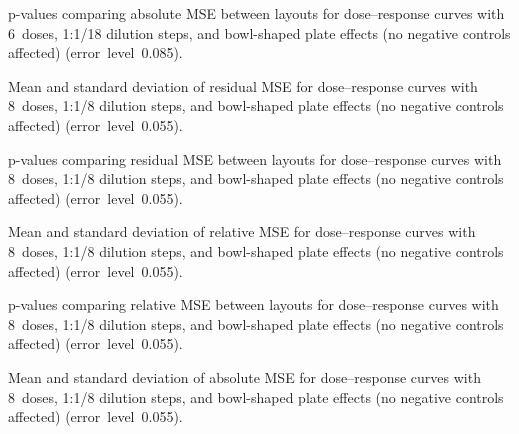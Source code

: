 \begin{table}[p]
    \centering
    \small
    
    \caption{p-values comparing absolute \ECIC{} MSE between layouts for dose--response curves with 6~doses, 1:1/18 dilution steps, and bowl-shaped plate effects (no negative controls affected) (error~level~0.085).}
    \label{tab:dr-absic50-pvalues-6doses-dil18-bowl-0.085}
\end{table}

\begin{table}[p]
    \centering
    \small
    
    \caption{Mean and standard deviation of residual MSE for dose--response curves with 8~doses, 1:1/8 dilution steps, and bowl-shaped plate effects (no negative controls affected) (error~level~0.055).}
    \label{tab:dr-residuals-mean-std-8doses-dil8-bowl-0.055}
\end{table}

\begin{table}[p]
    \centering
    \small
    
    \caption{p-values comparing residual MSE between layouts for dose--response curves with 8~doses, 1:1/8 dilution steps, and bowl-shaped plate effects (no negative controls affected) (error~level~0.055).}
    \label{tab:dr-residuals-pvalues-8doses-dil8-bowl-0.055}
\end{table}

\begin{table}[p]
    \centering
    \small
    
    \caption{Mean and standard deviation of relative \ECIC{} MSE for dose--response curves with 8~doses, 1:1/8 dilution steps, and bowl-shaped plate effects (no negative controls affected) (error~level~0.055).}
    \label{tab:dr-relic50-mean-std-8doses-dil8-bowl-0.055}
\end{table}

\begin{table}[p]
    \centering
    \small
    
    \caption{p-values comparing relative \ECIC{} MSE between layouts for dose--response curves with 8~doses, 1:1/8 dilution steps, and bowl-shaped plate effects (no negative controls affected) (error~level~0.055).}
    \label{tab:dr-relic50-pvalues-8doses-dil8-bowl-0.055}
\end{table}

\clearpage
\begin{table}[p]
    \centering
    \small
    
    \caption{Mean and standard deviation of absolute \ECIC{} MSE for dose--response curves with 8~doses, 1:1/8 dilution steps, and bowl-shaped plate effects (no negative controls affected) (error~level~0.055).}
    \label{tab:dr-absic50-mean-std-8doses-dil8-bowl-0.055}
\end{table}

